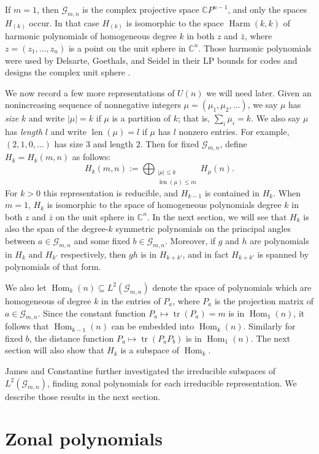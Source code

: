 \documentclass[12pt]{article}
\numberwithin{equation}{section}
\theoremstyle{plainsl}
\newcommand\defn[1]{\textsl{#1}}
\newcommand\sbs{\subseteq}
\newcommand\cx{{\mathbb C}}%
\newcommand\gras[2]{\mathcal{G}_{#1,#2}}
\newcommand\abs[1]{\left|#1\right|}
\newcommand\opk[1]{\mathop{\mathrm{#1}}\nolimits}
\newcommand\tr{\opk{tr}}
\newcommand\Harm{\opk{Harm}}
\newcommand\len{\opk{len}}
\newcommand\Hom{\opk{Hom}}
\begin{document}
If $m = 1$, then $\gras{m}{n}$ is the complex projective space $\cx P^{n-1}$, and only the spaces $H_{(k)}$ occur. In that case $H_{(k)}$ is isomorphic to the space $\Harm(k,k)$ of harmonic polynomials of homogeneous degree $k$ in both $z$ and $\bar{z}$, where $z = (z_1,\ldots,z_n)$ is a point on the unit sphere in $\cx^n$. Those harmonic polynomials were used by Delsarte, Goethals, and Seidel in their LP bounds for codes and designs the complex unit sphere \cite{dgs}.

We now record a few more representations of $U(n)$ we will need later. Given an nonincreasing sequence of nonnegative integers $\mu = (\mu_1,\mu_2,\ldots)$, we say $\mu$ has \defn{size} $k$ and write $\abs{\mu} = k$ if $\mu$ is a partition of $k$; that is, $\sum_i \mu_i = k$. We also say $\mu$ has \defn{length} $l$ and write $\len(\mu) = l$ if $\mu$ has $l$ nonzero entries. For example, $(2,1,0,\ldots)$ has size $3$ and length $2$. Then for fixed $\gras{m}{n}$, define $H_k = H_k(m,n)$ as follows:
\[
H_k(m,n) := \bigoplus_{\substack{\abs{\mu} \leq k \\ \len(\mu) \leq m}} H_\mu(n).
\]
For $k > 0$ this representation is reducible, and $H_{k-1}$ is contained in $H_k$. When $m=1$, $H_k$ is isomorphic to the space of homogeneous polynomials degree $k$ in both $z$ and $\bar{z}$ on the unit sphere in $\cx^n$. In the next section, we will see that $H_k$ is also the span of the
degree-$k$ symmetric polynomials on the principal angles between $a \in \gras{m}{n}$ and some fixed $b \in \gras{m}{n}$. Moreover, if $g$ and $h$ are polynomials in $H_k$ and $H_{k'}$ respectively, then $gh$ is in $H_{k+k'}$, and in fact $H_{k+k'}$ is spanned by polynomials of that form.

We also let $\Hom_k(n) \sbs L^2(\gras{m}{n})$ denote the space of polynomials which are homogeneous of degree $k$ in the entries of $P_a$, where $P_a$ is the projection matrix of $a \in \gras{m}{n}$. Since the constant function $P_a \mapsto \tr(P_a) = m$ is in $\Hom_1(n)$, it follows that $\Hom_{k-1}(n)$ can be embedded into $\Hom_k(n)$. Similarly for fixed $b$, the distance function $P_a \mapsto \tr(P_aP_b)$ is in $\Hom_1(n)$. The next section will also show that $H_k$ is a subspace of $\Hom_k$.

James and Constantine \cite{jc1} further investigated the irreducible subspaces of $L^2(\gras{m}{n})$, finding zonal polynomials for each irreducible representation. We describe those results in the next section.

\section{Zonal polynomials}
\label{sec:zonal}
\end{document}
